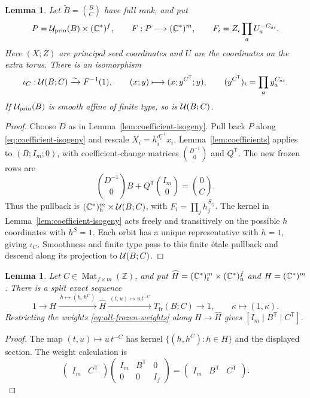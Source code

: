 \documentclass[12pt, letter]{amsart}
\newtheorem{lemma}[theorem]{Lemma}
\theoremstyle{definition}
\newcommand{\Z}{\mathbb Z}
\newcommand{\pr}{\mathrm{prin}}
\newcommand{\fr}{\mathrm{fr}}
\numberwithin{equation}{section}
\begin{document}
\begin{lemma}\label{lem:coefficient-fiber}
Let $\widetilde B=\binom BC$ have full rank, and put
\[
 P=\cU_{\pr}(B)\times(\C^*)^f,\qquad
 F:P\longrightarrow(\C^*)^m,\qquad
 F_i=Z_i\prod_a U_a^{-C_{ai}}.
\]
Here $(X;Z)$ are principal seed coordinates and $U$ are the
coordinates on the extra torus. There is an isomorphism
\begin{equation} \label{eq:ys}
 \iota_C:\mathcal{U}(B;C)\xrightarrow{\sim}F^{-1}(1),\qquad
 (x;y)\longmapsto(x;y^{C^{\mathsf T}};y),\qquad
 (y^{C^{\mathsf T}})_i=\prod_a y_a^{C_{ai}}.
\end{equation}
If $\cU_{\pr}(B)$ is smooth affine of finite type, so is
$\mathcal{U}(B;C)$.
\end{lemma}
\begin{proof}
Choose $D$ as in Lemma~\ref{lem:coefficient-isogeny}.
Pull back $P$ along \eqref{eq:coefficient-isogeny} and rescale
$X_i=h_i^{d_i^{-1}}x_i$.
Lemma~\ref{lem:coefficients} applies to $(B;I_m;0)$, with
coefficient-change matrices $\binom{D^{-1}}0$ and $Q^{\mathsf T}$.
The new frozen rows are
\[
 \binom{D^{-1}}0B+Q^{\mathsf T}\binom{I_m}0=\binom0C.
\]
Thus the pullback is $(\mathbb C^*)^m_h\times\mathcal{U}(B;C)$, with
$F_i=\prod_jh_j^{S_{ij}}$.
The kernel in Lemma~\ref{lem:coefficient-isogeny} acts freely
and transitively on the possible $h$ coordinates with $h^S=1$.
Each orbit has a unique representative with $h=1$, giving $\iota_C$.
Smoothness and finite type pass to this finite \'etale pullback
and descend along its projection to $\mathcal{U}(B;C)$.
\end{proof}





\begin{lemma}\label{lem:frozen-parameters}
Let $C\in\operatorname{Mat}_{f\times m}(\Z)$, and put
$\widehat H=(\mathbb C^*)^m_t\times(\mathbb C^*)^f_u$ and $H=(\mathbb C^*)^m$.
There is a split exact sequence
\begin{equation}\label{eq:frozen-torus-extension}
 1\longrightarrow H\xrightarrow{\ h\mapsto(h,h^C)\ }\widehat H
 \xrightarrow{\ (t,u)\mapsto u\,t^{-C}\ }
 T_{\fr}(B;C)\longrightarrow1,
 \qquad \kappa\longmapsto(1,\kappa).
\end{equation}
Restricting the weights \eqref{eq:all-frozen-weights} along
$H\to\widehat H$ gives $[I_m\mid B^{\mathsf T}\mid C^{\mathsf T}]$.
\end{lemma}
\begin{proof}
The map $(t,u)\mapsto u\,t^{-C}$ has kernel
$\{(h,h^C):h\in H\}$ and the displayed section.
The weight calculation is
\[
 \begin{pmatrix}I_m&C^{\mathsf T}\end{pmatrix}
 \begin{pmatrix}I_m&B^{\mathsf T}&0\\0&0&I_f\end{pmatrix}
 =\begin{pmatrix}I_m&B^{\mathsf T}&C^{\mathsf T}\end{pmatrix}.
\]
\end{proof}
\end{document}
